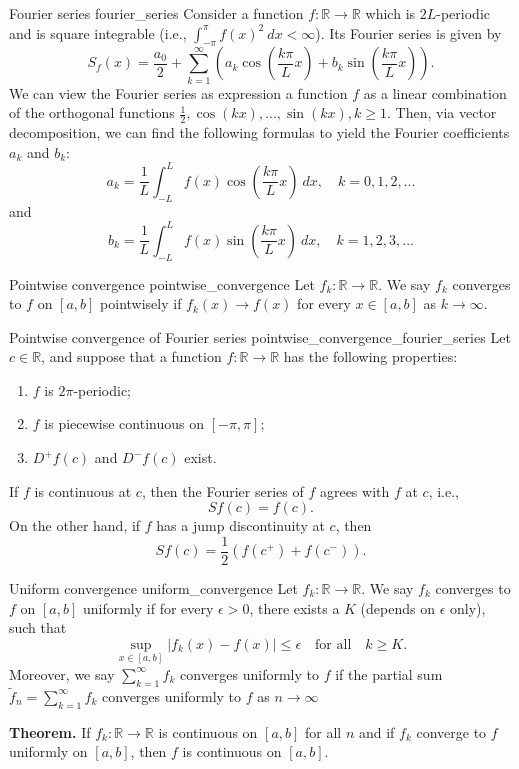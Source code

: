 \begin{definition}{Fourier series \cite{math2111_notes}}{fourier_series}
Consider a function $f : \mathbb{R} \to \mathbb{R}$ which is $2 L$-periodic and is square integrable (i.e., $\int_{-\pi}^\pi f(x)^2 \ dx < \infty $). Its Fourier series is given by
$$ S_f(x) = \frac{a_0}{2} + \sum_{k = 1}^{\infty} \left( a_k \cos \left( \frac{k \pi}{L}x \right) + b_k \sin \left( \frac{k \pi}{L}x \right) \right) . $$
We can view the Fourier series as expression a function $f$ as a linear combination of the orthogonal functions $\frac{1}{2}, \cos(kx), ..., \sin(kx), k \geq 1$. Then, via vector decomposition, we can find the following formulas to yield the Fourier coefficients $a_k$ and $b_k$:
$$ a_k = \frac{1}{L} \int_{-L}^L f(x) \cos \left( \frac{k \pi}{L}x \right) \ dx, \quad k = 0, 1, 2, ... $$
and
$$ b_k = \frac{1}{L} \int_{-L}^L f(x) \sin \left( \frac{k \pi}{L}x \right) \ dx, \quad k = 1, 2, 3, ... $$
\end{definition}

\begin{definition}{Pointwise convergence \cite{math2111_notes}}{pointwise_convergence}
Let $f_k : \mathbb{R} \to \mathbb{R}$. We say $f_k$ converges to $f$ on $[a, b]$ pointwisely if $f_k(x) \to f(x)$ for every $x \in [a, b]$ as $k \to \infty$.
\end{definition}

\begin{theorem}{Pointwise convergence of Fourier series \cite{math2111_notes}}{pointwise_convergence_fourier_series}
Let $c \in \mathbb{R}$, and suppose that a function $f : \mathbb{R} \to \mathbb{R}$ has the following properties:
\begin{enumerate}
	\item $f$ is $2 \pi$-periodic;
	\item $f$ is piecewise continuous on $[-\pi, \pi]$;
	\item $D^+ f(c)$ and $D^- f(c)$ exist.
\end{enumerate}
If $f$ is continuous at $c$, then the Fourier series of $f$ agrees with $f$ at $c$, i.e.,
$$ S f(c) = f(c) . $$
On the other hand, if $f$ has a jump discontinuity at $c$, then
$$ S f(c) = \frac{1}{2} \left( f(c^+) + f(c^-) \right) . $$
\end{theorem}

\begin{definition}{Uniform convergence \cite{math2111_notes}}{uniform_convergence}
Let $f_k : \mathbb{R} \to \mathbb{R}$. We say $f_k$ converges to $f$ on $[a, b]$ uniformly if for every $\epsilon > 0$, there exists a $K$ (depends on $\epsilon$ only), such that
$$ \sup_{x \in [a, b]} | f_k(x) - f(x) | \leq \epsilon \quad \text{for all} \quad k \geq K . $$
Moreover, we say $\sum_{k = 1}^{\infty} f_k$ converges uniformly to $f$ if the partial sum $\tilde{f}_n = \sum_{k = 1}^{\infty} f_k$ converges uniformly to $f$ as $n \to \infty$

\textbf{Theorem.} If $f_k : \mathbb{R} \to \mathbb{R}$ is continuous on $[a, b]$ for all $n$ and if $f_k$ converge to $f$ uniformly on $[a, b]$, then $f$ is continuous on $[a, b]$.
\end{definition}

